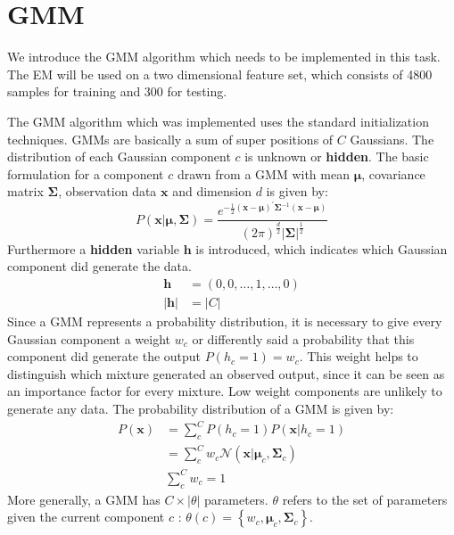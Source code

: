 \section{GMM}
We introduce the GMM algorithm which needs to be implemented in this task. The EM will be used on a two dimensional feature set, which consists of 4800 samples for training and 300 for testing.

The GMM algorithm which was implemented uses the standard initialization techniques.
GMMs are basically a sum of super positions of $C$ Gaussians. The distribution of each Gaussian component $c$ is unknown or \textbf{hidden}. The basic formulation for a component $c$ drawn from a GMM with mean $\boldsymbol{\mu}$, covariance matrix $\mathbf{\Sigma}$, observation data $\mathbf{x}$ and dimension $d$ is given by:
\begin{equation}
P(\mathbf{x}|\boldsymbol{\mu},\mathbf{\Sigma}) =\frac{\displaystyle e^{-\frac{1}{2} \displaystyle ( \mathbf{x}-\boldsymbol{\mu})^{'} \mathbf{\Sigma}^{-1}(\mathbf{x}-\boldsymbol{\mu}) } } {\displaystyle (2\pi)^{\frac{d}{2}} |\mathbf{\Sigma}|^{\frac{1}{2}}} 
\end{equation}
Furthermore a \textbf{hidden} variable $\mathbf{h}$ is introduced, which indicates which Gaussian component did generate the data.
\begin{equation*}
\begin{split}
\mathbf{h} &= (0,0, \ldots ,1, \ldots ,0) \\
|\mathbf{h}| &= |C|
\end{split}
\end{equation*}
Since a GMM represents a probability distribution, it is necessary to give every Gaussian component a weight $w_c$ or differently said a probability that this component did generate the output $P( h_c = 1 ) = w_c$. This weight helps to distinguish which mixture generated an observed output, since it can be seen as an importance factor for every mixture. Low weight components are unlikely to generate any data.
The probability distribution of a GMM is given by:
\begin{equation}
\label{eq:norm_gmm}
\begin{split}
P( \mathbf{x} ) &= \sum\limits_c^C P ( h_c = 1 ) P( \mathbf{x} | h_c = 1 )  \\
&= \sum\limits_c^C w_c \mathcal{N}( \mathbf{x} |\boldsymbol{\mu}_c,\mathbf{\Sigma}_c)\\
&\sum\limits_c^C w_c = 1 
\end{split}
\end{equation}
More generally, a GMM has $C \times |\theta|$ parameters. $\theta$ refers to the set of parameters given the current component $c$ : $\theta(c) = \left \{ {w_c,\boldsymbol{\mu}_c,\mathbf{\Sigma}_c}\right \}$.


